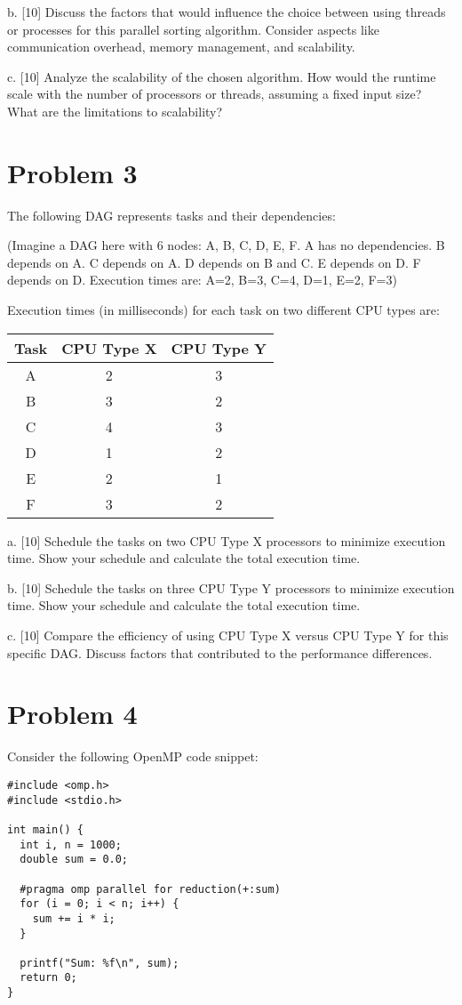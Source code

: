\documentclass{article}
\begin{document}
b. [10]  Discuss the factors that would influence the choice between using threads or processes for this parallel sorting algorithm. Consider aspects like communication overhead, memory management, and scalability.

c. [10]  Analyze the scalability of the chosen algorithm.  How would the runtime scale with the number of processors or threads, assuming a fixed input size? What are the limitations to scalability?


\section*{Problem 3}
The following DAG represents tasks and their dependencies:

(Imagine a DAG here with 6 nodes: A, B, C, D, E, F. A has no dependencies. B depends on A. C depends on A. D depends on B and C. E depends on D. F depends on D.  Execution times are: A=2, B=3, C=4, D=1, E=2, F=3)


Execution times (in milliseconds) for each task on two different CPU types are:

\begin{tabular}{|c|c|c|}
\hline
Task & CPU Type X & CPU Type Y \\
\hline
A & 2 & 3 \\
B & 3 & 2 \\
C & 4 & 3 \\
D & 1 & 2 \\
E & 2 & 1 \\
F & 3 & 2 \\
\hline
\end{tabular}

a. [10] Schedule the tasks on two CPU Type X processors to minimize execution time.  Show your schedule and calculate the total execution time.

b. [10] Schedule the tasks on three CPU Type Y processors to minimize execution time. Show your schedule and calculate the total execution time.

c. [10]  Compare the efficiency of using CPU Type X versus CPU Type Y for this specific DAG.  Discuss factors that contributed to the performance differences.


\section*{Problem 4}
Consider the following OpenMP code snippet:

\begin{verbatim}
#include <omp.h>
#include <stdio.h>

int main() {
  int i, n = 1000;
  double sum = 0.0;

  #pragma omp parallel for reduction(+:sum)
  for (i = 0; i < n; i++) {
    sum += i * i;
  }

  printf("Sum: %f\n", sum);
  return 0;
}
\end{verbatim}
\end{document}
